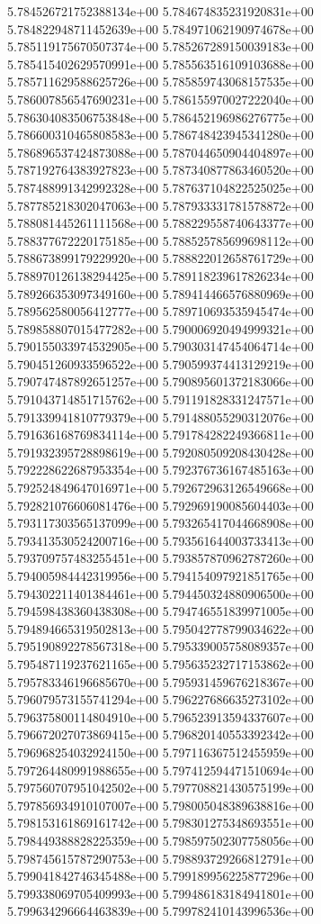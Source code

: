 5.784526721752388134e+00
5.784674835231920831e+00
5.784822948711452639e+00
5.784971062190974678e+00
5.785119175670507374e+00
5.785267289150039183e+00
5.785415402629570991e+00
5.785563516109103688e+00
5.785711629588625726e+00
5.785859743068157535e+00
5.786007856547690231e+00
5.786155970027222040e+00
5.786304083506753848e+00
5.786452196986276775e+00
5.786600310465808583e+00
5.786748423945341280e+00
5.786896537424873088e+00
5.787044650904404897e+00
5.787192764383927823e+00
5.787340877863460520e+00
5.787488991342992328e+00
5.787637104822525025e+00
5.787785218302047063e+00
5.787933331781578872e+00
5.788081445261111568e+00
5.788229558740643377e+00
5.788377672220175185e+00
5.788525785699698112e+00
5.788673899179229920e+00
5.788822012658761729e+00
5.788970126138294425e+00
5.789118239617826234e+00
5.789266353097349160e+00
5.789414466576880969e+00
5.789562580056412777e+00
5.789710693535945474e+00
5.789858807015477282e+00
5.790006920494999321e+00
5.790155033974532905e+00
5.790303147454064714e+00
5.790451260933596522e+00
5.790599374413129219e+00
5.790747487892651257e+00
5.790895601372183066e+00
5.791043714851715762e+00
5.791191828331247571e+00
5.791339941810779379e+00
5.791488055290312076e+00
5.791636168769834114e+00
5.791784282249366811e+00
5.791932395728898619e+00
5.792080509208430428e+00
5.792228622687953354e+00
5.792376736167485163e+00
5.792524849647016971e+00
5.792672963126549668e+00
5.792821076606081476e+00
5.792969190085604403e+00
5.793117303565137099e+00
5.793265417044668908e+00
5.793413530524200716e+00
5.793561644003733413e+00
5.793709757483255451e+00
5.793857870962787260e+00
5.794005984442319956e+00
5.794154097921851765e+00
5.794302211401384461e+00
5.794450324880906500e+00
5.794598438360438308e+00
5.794746551839971005e+00
5.794894665319502813e+00
5.795042778799034622e+00
5.795190892278567318e+00
5.795339005758089357e+00
5.795487119237621165e+00
5.795635232717153862e+00
5.795783346196685670e+00
5.795931459676218367e+00
5.796079573155741294e+00
5.796227686635273102e+00
5.796375800114804910e+00
5.796523913594337607e+00
5.796672027073869415e+00
5.796820140553392342e+00
5.796968254032924150e+00
5.797116367512455959e+00
5.797264480991988655e+00
5.797412594471510694e+00
5.797560707951042502e+00
5.797708821430575199e+00
5.797856934910107007e+00
5.798005048389638816e+00
5.798153161869161742e+00
5.798301275348693551e+00
5.798449388828225359e+00
5.798597502307758056e+00
5.798745615787290753e+00
5.798893729266812791e+00
5.799041842746345488e+00
5.799189956225877296e+00
5.799338069705409993e+00
5.799486183184941801e+00
5.799634296664463839e+00
5.799782410143996536e+00
